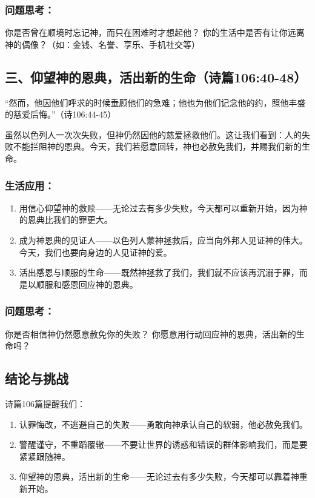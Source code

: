 \documentclass[a4paper, 12pt]{article}
\begin{document}
\subsubsection*{问题思考：}

你是否曾在顺境时忘记神，而只在困难时才想起他？
你的生活中是否有让你远离神的偶像？（如：金钱、名誉、享乐、手机社交等）
\subsection*{三、仰望神的恩典，活出新的生命（诗篇106:40-48）}
“然而，他因他们呼求的时候垂顾他们的急难；他也为他们记念他的约，照他丰盛的慈爱后悔。”（诗106:44-45）

虽然以色列人一次次失败，但神仍然因他的慈爱拯救他们。这让我们看到：人的失败不能拦阻神的恩典。今天，我们若愿意回转，神也必赦免我们，并赐我们新的生命。

\subsubsection*{生活应用：}
\begin{enumerate}
    \item 用信心仰望神的救赎——无论过去有多少失败，今天都可以重新开始，因为神的恩典比我们的罪更大。

    \item 成为神恩典的见证人——以色列人蒙神拯救后，应当向外邦人见证神的伟大。今天，我们也要向身边的人见证神的爱。

    \item 活出感恩与顺服的生命——既然神拯救了我们，我们就不应该再沉溺于罪，而是以顺服和感恩回应神的恩典。

\end{enumerate}
\subsubsection*{问题思考：}

你是否相信神仍然愿意赦免你的失败？
你愿意用行动回应神的恩典，活出新的生命吗？
\subsection*{结论与挑战}
诗篇106篇提醒我们：
\begin{enumerate}
    \item 认罪悔改，不逃避自己的失败——勇敢向神承认自己的软弱，他必赦免我们。

    \item 警醒谨守，不重蹈覆辙——不要让世界的诱惑和错误的群体影响我们，而是要紧紧跟随神。

    \item 仰望神的恩典，活出新的生命——无论过去有多少失败，今天都可以靠着神重新开始。

\end{enumerate}
\end{document}
